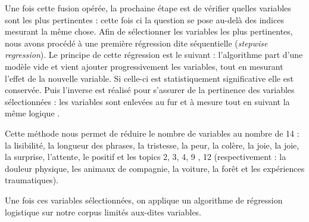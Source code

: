 \documentclass[12pt,a4paper,oneside,titlepage]{book} %
\begin{document}
Une fois cette fusion opérée, la prochaine étape est de vérifier quelles variables sont les plus pertinentes  : cette fois ci la question se pose au-delà des indices mesurant la même chose. Afin de sélectionner les variables les plus pertinentes, nous avons procédé à une première régression dite séquentielle (\emph{stepwise regression}).  Le principe de cette régression est le suivant : l'algorithme part d'une modèle vide et vient ajouter progressivement les variables, tout en mesurant l'effet de la nouvelle variable. Si celle-ci est statistiquement significative elle est conservée. Puis l'inverse est réalisé pour s'assurer de la pertinence des variables sélectionnées : les variables sont enlevées au fur et à mesure tout en suivant la même logique . 

Cette méthode nous permet de réduire le nombre de variables au nombre de  14 : la lisibilité, la longueur des phrases, la tristesse, la peur, la colère, la joie, la joie, la surprise, l'attente, le positif et les topics 2, 3, 4, 9 , 12 (respectivement  : la douleur physique, les animaux de compagnie, la voiture, la forêt et les expériences traumatiques). 

Une fois ces variables sélectionnées, on applique un algorithme de régression logistique sur notre corpus limités aux-dites variables.
\end{document}
